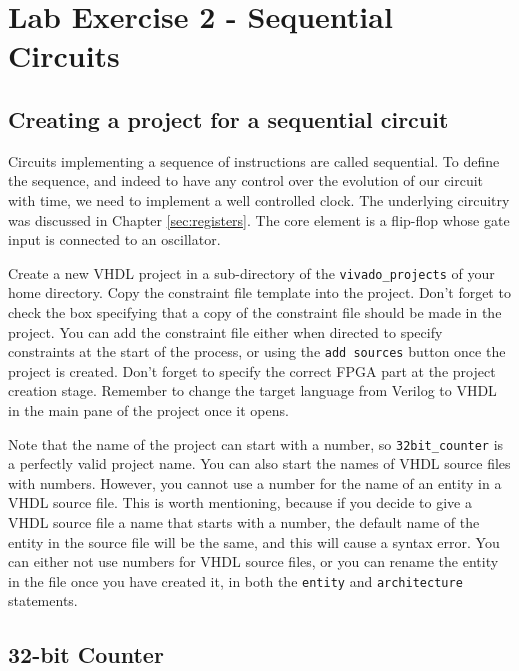 \documentclass[../physical_computing.tex]{subfiles}
\begin{document}
\chapter{Lab Exercise 2 - Sequential Circuits}
\label{sec:appendix_3}

\section{Creating a project for a sequential circuit}
\label{sec:sequential}

Circuits implementing a sequence of instructions are called sequential. To define the sequence, and indeed to have any control over the evolution of our circuit with time, we need to implement a well controlled clock. The underlying circuitry was discussed in Chapter \ref{sec:registers}. The core element is a flip-flop whose gate input is connected to an oscillator.

Create a new VHDL project in a sub-directory of the \texttt{vivado\_projects} of your home directory. Copy the constraint file template into the project. Don't forget to check the box specifying that a copy of the constraint file should be made in the project. You can add the constraint file either when directed to specify constraints at the start of the process, or using the \texttt{add sources} button once the project is created. Don't forget to specify the correct FPGA part at the project creation stage. Remember to change the target language from Verilog to VHDL in the main pane of the project once it opens. 

Note that the name of the project can start with a number, so \texttt{32bit\_counter} is a perfectly valid project name. You can also start the names of VHDL source files with numbers. However, you cannot use a number for the name of an entity in a VHDL source file. This is worth mentioning, because if you decide to give a VHDL source file a name that starts with a number, the default name of the entity in the source file will be the same, and this will cause a syntax error. You can either not use numbers for VHDL source files, or you can rename the entity in the file once you have created it, in both the \texttt{entity} and \texttt{architecture} statements.

\section{32-bit Counter}
\label{sec:32bit}
\end{document}
